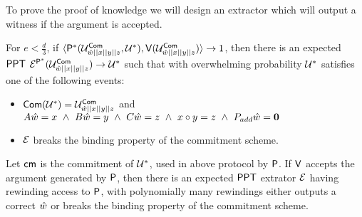 To prove the proof of knowledge we will design an extractor which will output a witness if the argument is accepted.

\begin{theorem}
	For $e < \frac{d}{3}$, if $\langle \mathsf{P}^*(\mathcal{U}^{\mathsf{Com}}_{\hat{w}||x||y||z}, \mathcal{U}^*),\mathsf{V}(\mathcal{U}^{\mathsf{Com}}_{\hat{w}||x||y||z})\rangle \rightarrow 1$, then there is an expected $\mathsf{PPT}$ $\mathcal{E}^{\mathsf{P}^*}(\mathcal{U}^{\mathsf{Com}}_{\hat{w}||x||y||z}) \rightarrow \mathcal{U}^*$ such that with overwhelming probability $\mathcal{U}^*$ satisfies one of the following events:
	\begin{itemize}
		\item $\mathsf{Com}(\mathcal{U}^*)=\mathcal{U}^{\mathsf{Com}}_{\hat{w}||x||y||z}$ and $A\hat{w} = x\text{ }\wedge\text{ } B \hat{w} = y\text{ } \wedge \text{ }C \hat{w} = z\text{ } \wedge \text{ }x\circ y =z\text{ } \wedge\text{ } P_{add} \hat{w} = \bm{0}$
		\item $\mathcal{E}$ breaks the binding property of the commitment scheme.
		
	\end{itemize}
	Let $\mathsf{cm}$ is the commitment of $\mathcal{U}^*$, used in above protocol by $\mathsf{P}$. If $\mathsf{V}$ accepts the argument generated by $\mathsf{P}$, then there is an expected $\mathsf{PPT}$ extrator $\mathcal{E}$ having rewinding access to $\mathsf{P}$, with polynomially many rewindings either outputs a correct $\hat{w}$ or breaks the binding property of the commitment scheme.
\end{theorem}

